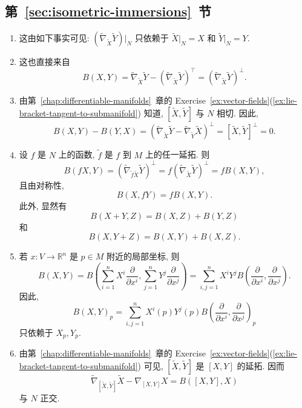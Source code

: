 \subsection{\texorpdfstring{第~\ref{sec:isometric-immersions}~节}{等距浸入}}\label{subsec:solutions-isometric-immersions}

\begin{description}[font=\normalfont,leftmargin=2em,labelwidth=1.5em]
\begin{enumerate}[label=(\alph*),ref=\alph*,leftmargin=*]
\item 这由如下事实可见: $(\widetilde\nabla_{\widetilde X}\widetilde Y)|_N$ 只依赖于 $\widetilde X|_N=X$ 和 $\widetilde Y|_N=Y$.
\item 这也直接来自
\[
  B(X,Y)=\widetilde\nabla_{\widetilde X}\widetilde Y
           -(\widetilde\nabla_{\widetilde X}\widetilde Y)^\top
         =(\widetilde\nabla_{\widetilde X}\widetilde Y)^\perp.
\]
\item 由第~\ref{chap:differentiable-manifolds}~章的 Exercise~\ref{ex:vector-fields}(\ref{ex:lie-bracket-tangent-to-submanifold}) 知道, $[\widetilde X,\widetilde Y]$ 与 $N$ 相切. 因此,
\[
  B(X,Y)-B(Y,X)=(\widetilde\nabla_{\widetilde X}\widetilde Y
                       -\widetilde\nabla_{\widetilde Y}\widetilde X)^\perp
              =[\widetilde X,\widetilde Y]^\perp=0.
\]
\item 设 $f$ 是 $N$ 上的函数, $\widetilde f$ 是 $f$ 到 $M$ 上的任一延拓. 则
\[
  B(fX,Y)=(\widetilde\nabla_{\widetilde f\widetilde X}\widetilde Y)^\perp
         =f(\widetilde\nabla_{\widetilde X}\widetilde Y)^\perp=fB(X,Y),
\]
且由对称性,
\[
  B(X,fY)=fB(X,Y).
\]
此外, 显然有
\[
  B(X+Y,Z)=B(X,Z)+B(Y,Z)
\]
和
\[
  B(X,Y+Z)=B(X,Y)+B(X,Z).
\]
\item 若 $x:V\to\mathbb{R}^n$ 是 $p\in M$ 附近的局部坐标, 则
\[
  B(X,Y)=B\left(\sum_{i=1}^nX^i\frac{\partial}{\partial x^i},
               \sum_{j=1}^nY^j\frac{\partial}{\partial x^j}\right)
        =\sum_{i,j=1}^nX^iY^jB\left(\frac{\partial}{\partial x^i},\frac{\partial}{\partial x^j}\right).
\]
因此,
\[
  B(X,Y)_p=\sum_{i,j=1}^nX^i(p)Y^j(p)B\left(\frac{\partial}{\partial x^i},
                                           \frac{\partial}{\partial x^j}\right)_p
\]
只依赖于 $X_p,Y_p$.
\item 由第~\ref{chap:differentiable-manifolds}~章的 Exercise~\ref{ex:vector-fields}(\ref{ex:lie-bracket-tangent-to-submanifold}) 可见, $[\widetilde X,\widetilde Y]$ 是 $[X,Y]$ 的延拓. 因而
\[
  \widetilde\nabla_{[\widetilde X,\widetilde Y]}\widetilde X-\nabla_{[X,Y]}X=B([X,Y],X)
\]
与 $N$ 正交.
\end{enumerate}


\end{description}
